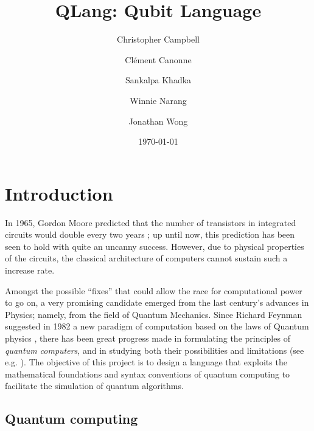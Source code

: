 \documentclass[11pt]{article}
\newcommand{\QL}{\textsf{QLang}\xspace}
\begin{document}

\title{\QL: Qubit Language}
\author{
  Christopher Campbell
  \and Cl\'ement Canonne
  \and Sankalpa Khadka
  \and Winnie Narang
  \and Jonathan Wong
}
\date{\today}



\maketitle


\section{Introduction}

In 1965, Gordon Moore predicted that the number of transistors in integrated circuits would double every two years \cite{Moore:65}; up until now, this prediction has been seen to hold with quite an uncanny success. However, due to physical properties of the circuits, the classical architecture of computers cannot sustain such a increase rate.

Amongst the possible ``fixes'' that could allow the race for computational power to go on, a very promising candidate emerged from the last century's advances in Physics; namely, from the field of Quantum Mechanics. Since Richard Feynman suggested in 1982 a new paradigm of computation based on the laws of Quantum physics \cite{Feynman:82}, there has been great progress made in formulating the principles of \emph{quantum computers}, and in studying both their possibilities and limitations (see e.g. \cite{Shor:98,Williams:08,Nielsen:11}). The objective of this project is to design a language that exploits the mathematical foundations and syntax conventions of quantum computing to facilitate the simulation of quantum algorithms.

\subsection{Quantum computing}
\end{document}

